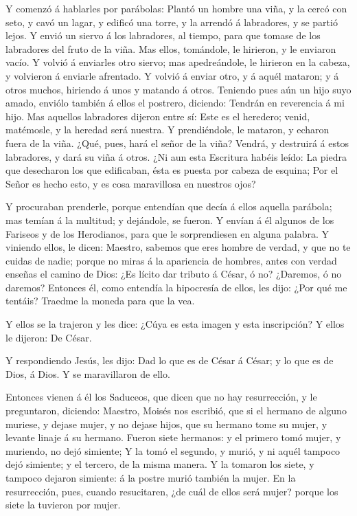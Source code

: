  Y comenzó á hablarles por parábolas: Plantó un hombre una
viña, y la cercó con seto, y cavó un lagar, y edificó una torre, y la
arrendó á labradores, y se partió lejos.  Y envió un siervo
á los labradores, al tiempo, para que tomase de los labradores del fruto
de la viña.  Mas ellos, tomándole, le hirieron, y le
enviaron vacío.  Y volvió á enviarles otro siervo; mas
apedreándole, le hirieron en la cabeza, y volvieron á enviarle
afrentado.  Y volvió á enviar otro, y á aquél mataron; y á
otros muchos, hiriendo á unos y matando á otros.  Teniendo
pues aún un hijo suyo amado, enviólo también á ellos el postrero,
diciendo: Tendrán en reverencia á mi hijo.  Mas aquellos
labradores dijeron entre sí: Este es el heredero; venid, matémosle, y la
heredad será nuestra.  Y prendiéndole, le mataron, y echaron
fuera de la viña.  ¿Qué, pues, hará el señor de la viña?
Vendrá, y destruirá á estos labradores, y dará su viña á otros.
 ¿Ni aun esta Escritura habéis leído: La piedra que
desecharon los que edificaban, ésta es puesta por cabeza de esquina;
 Por el Señor es hecho esto, y es cosa maravillosa en
nuestros ojos?

 Y procuraban prenderle, porque entendían que decía á ellos
aquella parábola; mas temían á la multitud; y dejándole, se fueron.
 Y envían á él algunos de los Fariseos y de los Herodianos,
para que le sorprendiesen en alguna palabra.  Y viniendo
ellos, le dicen: Maestro, sabemos que eres hombre de verdad, y que no te
cuidas de nadie; porque no miras á la apariencia de hombres, antes con
verdad enseñas el camino de Dios: ¿Es lícito dar tributo á César, ó no?
¿Daremos, ó no daremos?  Entonces él, como entendía la
hipocresía de ellos, les dijo: ¿Por qué me tentáis? Traedme la moneda
para que la vea.

 Y ellos se la trajeron y les dice: ¿Cúya es esta imagen y
esta inscripción? Y ellos le dijeron: De César.

 Y respondiendo Jesús, les dijo: Dad lo que es de César á
César; y lo que es de Dios, á Dios. Y se maravillaron de ello.

 Entonces vienen á él los Saduceos, que dicen que no hay
resurrección, y le preguntaron, diciendo:  Maestro, Moisés
nos escribió, que si el hermano de alguno muriese, y dejase mujer, y no
dejase hijos, que su hermano tome su mujer, y levante linaje á su
hermano.  Fueron siete hermanos: y el primero tomó mujer, y
muriendo, no dejó simiente;  Y la tomó el segundo, y murió,
y ni aquél tampoco dejó simiente; y el tercero, de la misma manera.
 Y la tomaron los siete, y tampoco dejaron simiente: á la
postre murió también la mujer.  En la resurrección, pues,
cuando resucitaren, ¿de cuál de ellos será mujer? porque los siete la
tuvieron por mujer.


